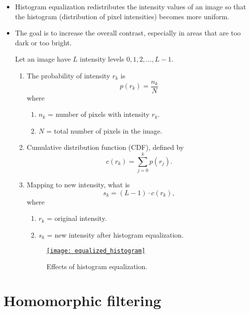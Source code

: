 \begin{itemize}
\item Histogram equalization \cite{gonzalez2009digital}
  redistributes the intensity values of an image so that the histogram
  (distribution of pixel intensities) becomes more uniform.
\item The goal is to increase the overall contrast, especially in
  areas that are too dark or too bright.

Let an image have $L$ intensity levels $0, 1, 2, \dots, L-1$.

\begin{enumerate}
  \item The probability of intensity $r_k$ is
\[
p(r_k) = \frac{n_k}{N}
\]
where 
\begin{enumerate}
\item $n_k$ = number of pixels with intensity $r_k$.
\item $N$ = total number of pixels in the image.
\end{enumerate}

\item Cumulative distribution function (CDF), defined by
\[
c(r_k) = \sum_{j=0}^{k} p(r_j).
\]

\item Mapping to new intensity, what is
\[
s_k = (L-1) \cdot c(r_k),
\]
where 
\begin{enumerate}
\item $r_k$ = original intensity.
\item $s_k$ = new intensity after histogram equalization.
\end{enumerate}

\begin{figure}[H]
  \vspace{-0ex}
  \centering
  \href{https://github.com/vicente-gonzalez-ruiz/medical_imaging/blob/main/notebooks/equalized_histogram.ipynb}{\texttt{[image: equalized\_histogram]}}
  \caption{Effects of histogram equalization.}
  \label{fig:histogram_equalization}
\end{figure}

\end{enumerate}
\end{itemize}


\section{Homomorphic filtering \cite{gonzalez2009digital}}

